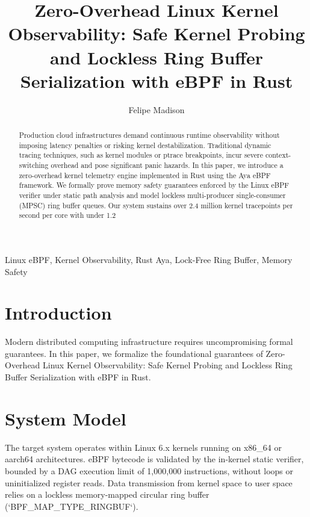 \documentclass[10pt,journal,compsoc]{IEEEtran}
\begin{document}
\title{Zero-Overhead Linux Kernel Observability: Safe Kernel Probing and Lockless Ring Buffer Serialization with eBPF in Rust}
\author{Felipe Madison\\
}

\maketitle

\begin{abstract}
Production cloud infrastructures demand continuous runtime observability without imposing latency penalties or risking kernel destabilization. Traditional dynamic tracing techniques, such as kernel modules or ptrace breakpoints, incur severe context-switching overhead and pose significant panic hazards. In this paper, we introduce a zero-overhead kernel telemetry engine implemented in Rust using the Aya eBPF framework. We formally prove memory safety guarantees enforced by the Linux eBPF verifier under static path analysis and model lockless multi-producer single-consumer (MPSC) ring buffer queues. Our system sustains over 2.4 million kernel tracepoints per second per core with under 1.2%
\end{abstract}

\begin{IEEEkeywords}
Linux eBPF, Kernel Observability, Rust Aya, Lock-Free Ring Buffer, Memory Safety
\end{IEEEkeywords}

\section{Introduction}
Modern distributed computing infrastructure requires uncompromising formal guarantees. In this paper, we formalize the foundational guarantees of Zero-Overhead Linux Kernel Observability: Safe Kernel Probing and Lockless Ring Buffer Serialization with eBPF in Rust.

\section{System Model}
The target system operates within Linux 6.x kernels running on x86_64 or aarch64 architectures. eBPF bytecode is validated by the in-kernel static verifier, bounded by a DAG execution limit of 1,000,000 instructions, without loops or uninitialized register reads. Data transmission from kernel space to user space relies on a lockless memory-mapped circular ring buffer (`BPF_MAP_TYPE_RINGBUF`).
\end{document}
